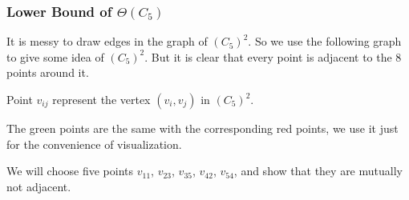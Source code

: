 \begin{frame}
      \frametitle{Lower Bound of $\Theta(C_{5})$}

      It is messy to draw edges in the graph of $(C_{5})^{2}$. So we use the following graph to give some idea of $(C_{5})^{2}$. But it is clear that every point is adjacent to the 8 points around it.

      Point $v_{ij}$ represent the vertex $(v_{i},v_{j})$ in $(C_{5})^{2}$.

      The green points are the same with the corresponding red points, we use it just for the convenience of visualization.

      \pause

      We will choose five points $v_{11}$, $v_{23}$, $v_{35}$, $v_{42}$, $v_{54}$, and show that they are mutually not adjacent.

\end{frame}

